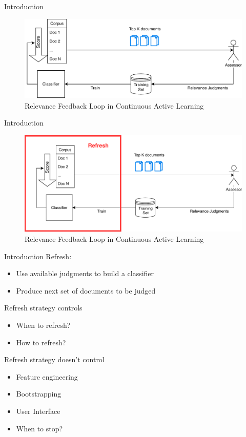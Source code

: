 \documentclass[14pt]{beamer}
\begin{document}
\begin{frame}{Introduction}
\begin{figure}
 \centering 
 \includegraphics[width=1.0\textwidth]{animation/2.pdf}
 \caption{Relevance Feedback Loop in Continuous Active Learning}
\end{figure}
\end{frame}

\begin{frame}{Introduction}
\begin{figure}
 \centering 
 \includegraphics[width=1.0\textwidth]{animation/3.pdf}
 \caption{Relevance Feedback Loop in Continuous Active Learning}
\end{figure}
\end{frame}

\begin{frame}{Introduction}
Refresh:
\begin{itemize}
    \item Use available judgments to build a classifier
    \item Produce next set of documents to be judged
\end{itemize}

\pause
\vskip 0.5cm
Refresh strategy controls
\begin{itemize}
    \item When to refresh?
    \item How to refresh?
\end{itemize}

\pause
\vskip 0.5cm
Refresh strategy doesn't control
\begin{itemize}
    \item Feature engineering
    \item Bootstrapping
    \item User Interface
    \item When to stop?
\end{itemize}
\end{frame}
\end{document}
